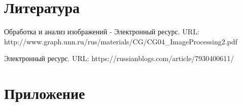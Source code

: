 \documentclass{report}
\begin{document}
\newpage

\section*{Литература}
\par Обработка и анализ изображений - Электронный ресурс. \newline URL: http://www.graph.unn.ru/rus/materials/CG/CG04_ImageProcessing2.pdf
\par Электронный ресурс.  \newline URL: https://russianblogs.com/article/7930400611/

\newpage

\section*{Приложение}
\end{document}
